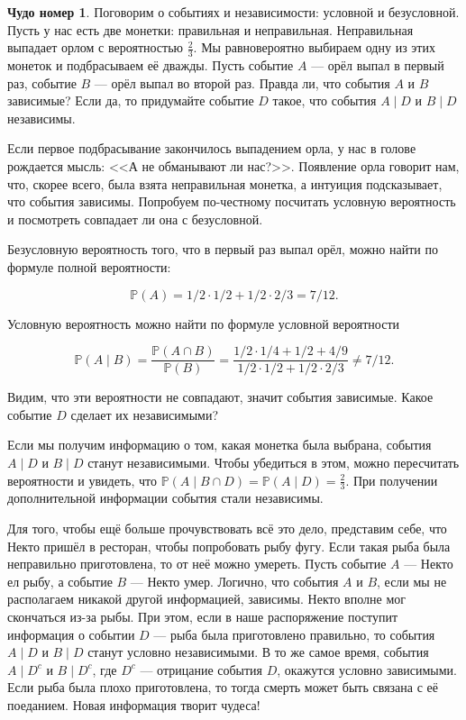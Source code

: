 \documentclass[12pt, a4paper, oneside]{extreport}
\def \mbb{\mathbb}
\def \PP{\mbb{P}}
\theoremstyle{plain}              %
\theoremstyle{definition}         %
\newtheorem{chudo}{Чудо номер}   %
\begin{document}
\begin{chudo}
Поговорим о событиях и независимости: условной и безусловной. Пусть у нас есть две монетки: правильная и неправильная. Неправильная выпадает орлом с вероятностью $\frac{2}{3}$. Мы равновероятно выбираем одну из этих монеток и подбрасываем её дважды. Пусть событие $A$ --- орёл выпал в первый раз, событие $B$ --- орёл выпал во второй раз. Правда ли, что события $A$ и $B$ зависимые? Если да, то придумайте событие $D$ такое, что события $A \mid D$ и $B \mid D$ независимы.
\end{chudo}

Если первое подбрасывание закончилось выпадением орла, у нас в голове рождается мысль: <<А не обманывают ли нас?>>. Появление орла говорит нам, что, скорее всего, была взята неправильная монетка, а интуиция подсказывает, что события зависимы. Попробуем по-честному посчитать условную вероятность и посмотреть совпадает ли она с безусловной.

 Безусловную вероятность того, что в первый раз выпал орёл, можно найти по формуле полной вероятности:

\[\PP(A) = 1/2 \cdot 1/2 + 1/2 \cdot 2/3 = 7/12. \]

Условную вероятность можно найти по формуле условной вероятности

\[\PP(A \mid B) = \frac{\PP(A \cap B)}{\PP(B)} = \frac{1/2 \cdot 1/4 + 1/2 + 4/9}{1/2 \cdot 1/2 + 1/2 \cdot 2/3} \neq 7/12.\]

Видим, что эти вероятности не совпадают, значит события зависимые. Какое событие $D$ сделает их независимыми?

 Если мы получим информацию о том, какая монетка была выбрана, события $A \mid D$ и $B \mid D$ станут независимыми. Чтобы убедиться в этом, можно пересчитать  вероятности и увидеть, что $\PP(A \mid B \cap D) = \PP(A \mid D) = \frac{2}{3}$. При получении дополнительной информации события стали независимы.

Для того, чтобы ещё больше прочувствовать всё это дело, представим себе, что Некто пришёл в ресторан, чтобы попробовать рыбу фугу. Если такая рыба была неправильно приготовлена, то от неё можно умереть. Пусть событие $A$ ---  Некто ел рыбу, а событие $B$ --- Некто умер. Логично, что события $A$ и $B$, если мы не располагаем никакой другой информацией, зависимы. Некто вполне мог скончаться из-за рыбы. При этом, если в наше распоряжение поступит информация о событии $D$ --- рыба была приготовлено правильно, то события $A \mid D$ и $B \mid D$ станут условно независимыми. В то же самое время, события $A \mid  D^c$ и $B \mid D^c$, где $D^c$ --- отрицание события $D$, окажутся условно зависимыми. Если рыба была плохо приготовлена, то тогда смерть может быть связана с её поеданием. Новая информация творит чудеса!
\end{document}
